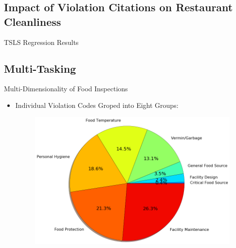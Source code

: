 \documentclass[handout]{beamer}
\begin{document}
\fi

\subsection{Impact of Violation Citations on Restaurant Cleanliness}
\begin{frame}{TSLS Regression Results}
\begin{table}
\centering
\scalebox{0.6}{}
\end{table}
\end{frame}


\subsection{Multi-Tasking}
\begin{frame}{Multi-Dimensionality of Food Inspections}
    \begin{itemize}
    \item Individual Violation Codes Groped into Eight Groups: 
    \begin{figure}
        \centering
        \includegraphics[scale = 0.3]{viol_group_pie.png}
    \end{figure}
    \end{itemize}
\end{frame}
\end{document}
